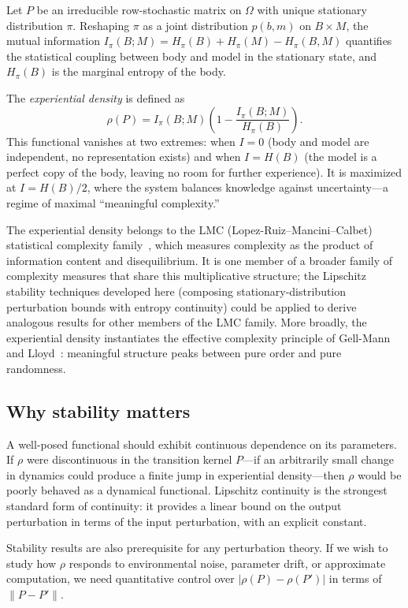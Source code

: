 \documentclass[11pt,a4paper]{article}
\begin{document}
Let $P$ be an irreducible row-stochastic matrix on $\Omega$ with
unique stationary distribution $\pi$.  Reshaping $\pi$ as a joint
distribution $p(b,m)$ on $B \times M$, the mutual information
$I_\pi(B;M) = H_\pi(B) + H_\pi(M) - H_\pi(B,M)$ quantifies the
statistical coupling between body and model in the stationary state,
and $H_\pi(B)$ is the marginal entropy of the body.

The \emph{experiential density} is defined as
\begin{equation}\label{eq:rho-intro}
  \rho(P) = I_\pi(B;M)\left(1 - \frac{I_\pi(B;M)}{H_\pi(B)}\right).
\end{equation}
This functional vanishes at two extremes: when $I = 0$ (body and model
are independent, no representation exists) and when $I = H(B)$ (the
model is a perfect copy of the body, leaving no room for further
experience).  It is maximized at $I = H(B)/2$, where the system balances
knowledge against uncertainty---a regime of maximal ``meaningful
complexity.''

The experiential density belongs to the LMC (Lopez-Ruiz--Mancini--Calbet)
statistical complexity family~\cite{LMC1995}, which measures complexity as
the product of information content and disequilibrium.  It is one member
of a broader family of complexity measures that share this multiplicative
structure; the Lipschitz stability techniques developed here (composing
stationary-distribution perturbation bounds with entropy continuity)
could be applied to derive analogous results for other members of the
LMC family.  More broadly, the experiential density instantiates the
effective complexity principle of Gell-Mann and
Lloyd~\cite{GellMannLloyd2003}: meaningful structure peaks between
pure order and pure randomness.

\subsection{Why stability matters}

A well-posed functional should exhibit continuous dependence on its
parameters.  If $\rho$ were discontinuous in the transition kernel
$P$---if an arbitrarily small change in dynamics could produce a finite
jump in experiential density---then $\rho$ would be poorly behaved as a
dynamical functional.  Lipschitz continuity is the strongest standard form of
continuity: it provides a linear bound on the output perturbation in
terms of the input perturbation, with an explicit constant.

Stability results are also prerequisite for any perturbation theory.
If we wish to study how $\rho$ responds to environmental noise, parameter
drift, or approximate computation, we need quantitative control over
$|\rho(P) - \rho(P')|$ in terms of $\|P - P'\|$.
\end{document}
